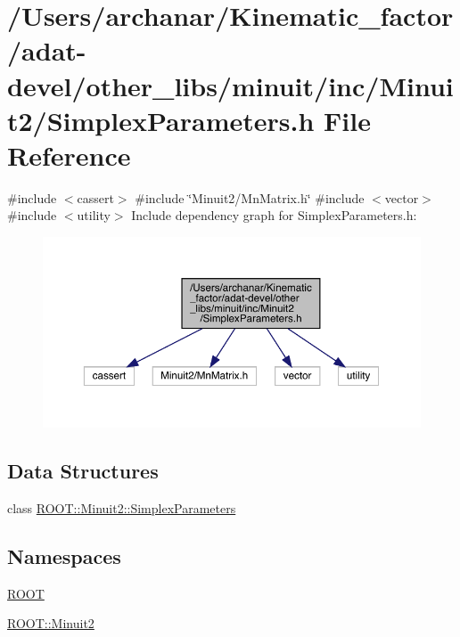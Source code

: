 \hypertarget{adat-devel_2other__libs_2minuit_2inc_2Minuit2_2SimplexParameters_8h}{}\section{/\+Users/archanar/\+Kinematic\+\_\+factor/adat-\/devel/other\+\_\+libs/minuit/inc/\+Minuit2/\+Simplex\+Parameters.h File Reference}
\label{adat-devel_2other__libs_2minuit_2inc_2Minuit2_2SimplexParameters_8h}
{\ttfamily \#include $<$cassert$>$}\newline
{\ttfamily \#include \char`\"{}Minuit2/\+Mn\+Matrix.\+h\char`\"{}}\newline
{\ttfamily \#include $<$vector$>$}\newline
{\ttfamily \#include $<$utility$>$}\newline
Include dependency graph for Simplex\+Parameters.\+h\+:
\nopagebreak
\begin{figure}[H]
\begin{center}
\leavevmode
\includegraphics[width=350pt]{dc/d36/adat-devel_2other__libs_2minuit_2inc_2Minuit2_2SimplexParameters_8h__incl}
\end{center}
\end{figure}
\subsection*{Data Structures}
\begin{DoxyCompactItemize}
\item 
class \mbox{\hyperlink{classROOT_1_1Minuit2_1_1SimplexParameters}{R\+O\+O\+T\+::\+Minuit2\+::\+Simplex\+Parameters}}
\end{DoxyCompactItemize}
\subsection*{Namespaces}
\begin{DoxyCompactItemize}
\item 
 \mbox{\hyperlink{namespaceROOT}{R\+O\+OT}}
\item 
 \mbox{\hyperlink{namespaceROOT_1_1Minuit2}{R\+O\+O\+T\+::\+Minuit2}}
\end{DoxyCompactItemize}
